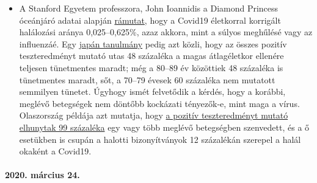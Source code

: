 \begin{itemize}
\item
  A Stanford Egyetem professzora, John Ioannidis a Diamond Princess
  óceánjáró adatai alapján
  \href{https://www.statnews.com/2020/03/17/a-fiasco-in-the-making-as-the-coronavirus-pandemic-takes-hold-we-are-making-decisions-without-reliable-data/}{rámutat},
  hogy a Covid19 életkorral korrigált halálozási aránya 0,025--0,625\%,
  azaz akkora, mint a súlyos meghűlésé vagy az influenzáé. Egy
  \href{https://www.niid.go.jp/niid/en/2019-ncov-e/9407-covid-dp-fe-01.html}{japán
  tanulmány} pedig azt közli, hogy az összes pozitív teszteredményt
  mutató utas 48 százaléka a magas átlagéletkor ellenére teljesen
  tünetmentes maradt; még a 80--89 év közöttiek 48 százaléka is
  tünetmentes maradt, sőt, a 70--79 évesek 60 százaléka nem mutatott
  semmilyen tünetet. Úgyhogy ismét felvetődik a kérdés, hogy a korábbi,
  meglévő betegségek nem döntőbb kockázati tényezők-e, mint maga a
  vírus. Olaszország példája azt mutatja, hogy
  \href{https://www.bloomberg.com/news/articles/2020-03-18/99-of-those-who-died-from-virus-had-other-illness-italy-says}{a
  pozitív teszteredményt mutató elhunytak 99 százaléka} egy vagy több
  meglévő betegségben szenvedett, és a ő esetükben is csupán a halotti
  bizonyítványok 12 százalékán szerepel a halál okaként a Covid19.\\
\end{itemize}

\hypertarget{2020-muxe1rcius-24}{%
\paragraph{2020. március 24.}\label{2020-muxe1rcius-24}}

